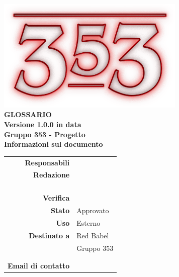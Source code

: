 \documentclass[openany, a4paper, 12pt]{report}
\begin{document}
\begin{titlepage}
\centering
\vfill
{
	\bfseries
	\vskip2cm
	\includegraphics[width=9cm]{../../common/images/logo.png} \\
	\vfill
	\Huge{GLOSSARIO}\\
	\vfill
	\Large Versione 1.0.0 in data \\
	\large Gruppo 353 - Progetto \progetto \\
	\vfill
	\normalsize Informazioni sul documento\\
	\begin{table}[htbp]
		\centering
		\renewcommand\arraystretch{1.2}
		\begin{tabular}{r|l}
			\hline
			\textbf{Responsabili}	& \Parwinder\\
			
			\textbf{Redazione} 		& \Valentina \\
									& \Riccardo \\
									& \Mirco \\
									& \Elena \\
									& \Gianluca \\
			\textbf{Verifica} 		& \Davide \\	
			
			\textbf{Stato} 			& Approvato\\
			\textbf{Uso}			& Esterno\\
			\textbf{Destinato a}   	& Red Babel\\
									& Gruppo 353\\
									& \Vardanega\\
									& \Cardin\\
			
			\textbf{Email di contatto}	& \mailgroup
		\end{tabular}
	\end{table}
	\vfill 
}      
\end{titlepage}

\tableofcontents
{}
\printglossary[style=glossaryStyle, nonumberlist]
 
\end{document}
